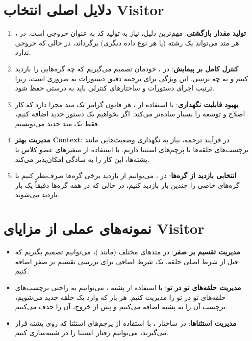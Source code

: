 \documentclass[12pt]{report}
\begin{document}
	\section{دلایل اصلی انتخاب Visitor}
	
	\begin{enumerate}
		\item \textbf{تولید مقدار بازگشتی}: مهم‌ترین دلیل، نیاز به تولید کد  به عنوان خروجی است. در ، هر متد می‌تواند یک رشته (یا هر نوع داده دیگری) برگرداند، در حالی که  خروجی ندارد.
		
		\item \textbf{کنترل کامل بر پیمایش}: در ، خودمان تصمیم می‌گیریم که چه گره‌هایی را بازدید کنیم و به چه ترتیبی. این ویژگی برای ترجمه دقیق دستورات  به  ضروری است، زیرا ترتیب اجرای دستورات و ساختارهای کنترلی باید به درستی حفظ شود.
		
		\item \textbf{بهبود قابلیت نگهداری}: با استفاده از ، هر قانون گرامر یک متد مجزا دارد که کار اصلاح و توسعه را بسیار ساده‌تر می‌کند. اگر بخواهیم یک دستور جدید اضافه کنیم، فقط یک متد جدید می‌نویسیم.
		
		\item \textbf{مدیریت بهتر Context}: در فرآیند ترجمه، نیاز به نگهداری وضعیت‌هایی مانند برچسب‌های حلقه‌ها یا پرچم‌های استثنا داریم.  با استفاده از متغیرهای عضو کلاس یا پشته‌ها، این کار را به سادگی امکان‌پذیر می‌کند.
		
		\item \textbf{انتخابی بازدید از گره‌ها}: در ، می‌توانیم از بازدید برخی گره‌ها صرف‌نظر کنیم یا گره‌های خاصی را چندین بار بازدید کنیم، در حالی که در  همه گره‌ها دقیقاً یک بار بازدید می‌شوند.
	\end{enumerate}
	
	\section{نمونه‌های عملی از مزایای Visitor}
	
	\begin{itemize}
		\item \textbf{مدیریت تقسیم بر صفر}: در متدهای مختلف (مانند )، می‌توانیم تصمیم بگیریم که قبل از شرط اصلی حلقه، یک شرط اضافی برای بررسی تقسیم بر صفر اضافه کنیم.
		
		\item \textbf{مدیریت حلقه‌های تو در تو}: با استفاده از پشته  ، می‌توانیم به راحتی برچسب‌های حلقه‌های تو در تو را مدیریت کنیم. هر بار که وارد یک حلقه جدید می‌شویم، برچسب آن را به پشته اضافه می‌کنیم و پس از خروج، آن را حذف می‌کنیم.
		
		\item \textbf{مدیریت استثناها}: در ساختار ، با استفاده از پرچم‌های استثنا که روی پشته قرار می‌گیرند، می‌توانیم رفتار استثنا را در  شبیه‌سازی کنیم.
	\end{itemize}
	
\end{document}
